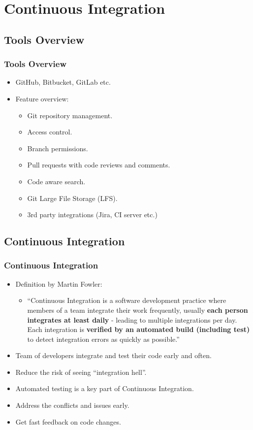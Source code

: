
\section[Continuous Integration]{Continuous Integration}


\subsection[]{Tools Overview}
\begin{frame}
\frametitle{Tools Overview}
\begin{itemize}
	\item GitHub, Bitbucket, GitLab etc.
	\item Feature overview:
		\begin{itemize}
		\item Git repository management.
		\item Access control.
		\item Branch permissions.
		\item Pull requests with code reviews and comments.
		\item Code aware search.
		\item Git Large File Storage (LFS).
		\item 3rd party integrations (Jira, CI server etc.)
		\end{itemize}
\end{itemize}
\end{frame}


\subsection[]{Continuous Integration}
\begin{frame}
\frametitle{Continuous Integration}
\begin{itemize}%
	\item Definition by Martin Fowler:
		\begin{itemize}
		\item “Continuous Integration is a software development practice where members of a team integrate their work frequently, usually \textbf{each person integrates at least daily} - leading to multiple integrations per day. Each integration is \textbf{verified by an automated build (including test)} to detect integration errors as quickly as possible.”
		\end{itemize}
	\item Team of developers integrate and test their code early and often.
	\item Reduce the risk of seeing “integration hell”.
	\item Automated testing is a key part of Continuous Integration.
	\item Address the conflicts and issues early.
	\item Get fast feedback on code changes.
\end{itemize}
\end{frame}

